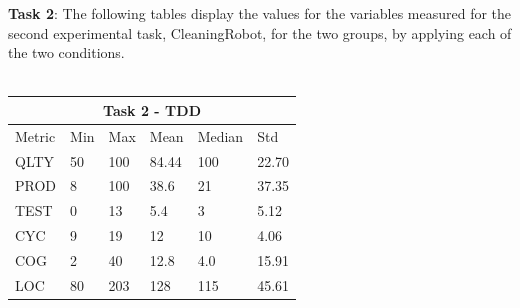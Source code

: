 \noindent \textbf{Task 2}: The following tables display the values for the variables measured for the second experimental task, CleaningRobot, for the two groups, by applying each of the two conditions.
\\ \  \\
\noindent
\begin{tabular}{ |p{2cm}||p{1.6cm}|p{1.6cm}|p{1.6cm}|p{1.6cm}|p{1.6cm}|}
    \hline
        \multicolumn{6}{|c|}{Task 2 - TDD} \\
    \hline
        Metric & Min & Max & Mean & Median & Std\\
    \hline
        QLTY & 50 & 100 & 84.44 & 100 & 22.70 \\
        PROD & 8 & 100 & 38.6 & 21 & 37.35 \\
        TEST & 0 & 13 & 5.4 & 3 & 5.12 \\
        CYC & 9 & 19 & 12 & 10 & 4.06 \\
        COG & 2 & 40 & 12.8 & 4.0 & 15.91 \\
        LOC & 80 & 203 & 128 & 115 & 45.61 \\
    \hline
\end{tabular}

